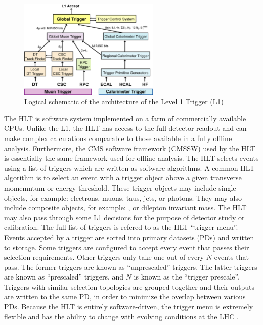 \begin{figure}
  \centering
  \includegraphics[width=0.6\textwidth]{tex/cms/fig/trigger-schematic.jpg}
  \caption{Logical schematic of the architecture of the Level 1 Trigger (L1) \cite{cms-jinst}}
  \label{fig:trigger}
\end{figure}

The HLT \cite{hlt} is software system implemented on a farm of commercially 
available CPUs.  
Unlike the L1, the HLT
has access to the full detector readout and can make complex calculations
comparable to those available in a fully offline analysis.
Furthermore, the CMS software framework (CMSSW) 
used by the HLT is essentially
the same framework used for offline analysis.
The HLT selects events using a list of triggers which are written as software algorithms.  
A common HLT algorithm is to select an event with a trigger object above a given
transverse momemntum or energy threshold.  These trigger objects 
may include single objects, for example: electrons, muons, taus, jets, or photons.  They
may also include composite objects, for example: \met, or dilepton invariant mass.
The HLT may also pass through some L1 decisions for the purpose of detector study or calibration.
The full list of triggers is refered to
as the HLT ``trigger menu''.  Events accepted by a trigger are sorted into 
primary datasets (PDs) 
and written to storage. 
Some triggers are configured to accept every event that passes their selection requirements.
Other triggers only take one out of every $N$ events that pass. 
The former triggers are known as ``unprescaled'' triggers. The latter
triggers are known as ``prescaled'' triggers, and  $N$ is known as the ``trigger prescale''.
Triggers with similar selection topologies
are grouped together and their outputs are written to the same PD, in order 
to minimize the overlap between various PDs.  
Because the HLT is entirely software-driven, the trigger menu is extremely 
flexible and has the ability to change with evolving conditions at the LHC 
\cite{cms-tdr,cms-jinst}.
